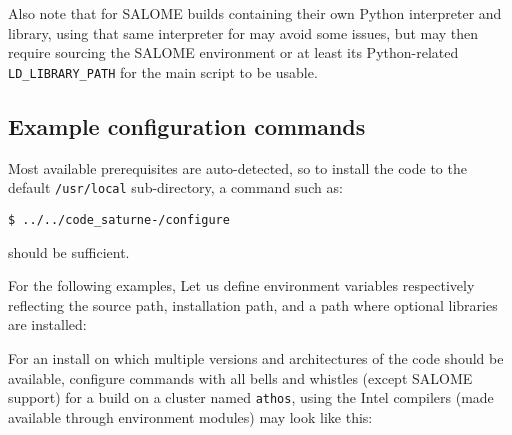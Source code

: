 \documentclass[a4paper,10pt,twoside]{csshortdoc}
\begin{document}
Also note that for SALOME builds containing their own Python interpreter and library,
using that same interpreter for \CS may avoid some issues, but may then require
sourcing the SALOME environment or at least its Python-related
\texttt{LD\_LIBRARY\_PATH} for the main \CS script to be usable.

\subsection{Example configuration commands\label{sec:config:examples}}

Most available prerequisites are auto-detected, so to install the
code to the default \texttt{/usr/local} sub-directory,
a command such as:

\texttt{\$ ../../code\_saturne-\verscs/configure}

should be sufficient.

For the following examples, Let us define environment variables respectively
reflecting the \CS source path, installation path, and a path where optional
libraries are installed:


For an install on which multiple
versions and architectures of the code should be available,
configure commands with all bells and whistles (except SALOME support) for a
build on a cluster named \texttt{athos}, using the Intel compilers
(made available through environment modules) may look like this:
\end{document}
